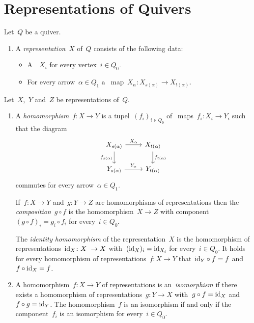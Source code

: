 \section{Representations of Quivers}


\begin{remarkdefinition}
  Let~$Q$ be a quiver.
  \begin{enumerate}
    \item
      A \emph{representation}~$X$ of~$Q$ consists of the following data:
      \begin{itemize}
        \item
          A~{\module{$\kf$}}~$X_i$ for every vertex~$i \in Q_0$.
        \item
          For every arrow~$\alpha \in Q_1$ a~{\klin} map~$X_\alpha \colon X_{s(\alpha)} \to X_{t(\alpha)}$.
      \end{itemize}
  \end{enumerate}
  Let~$X$,~$Y$ and~$Z$ be representations of~$Q$.
  \begin{enumerate}[resume]
    \item
      A \emph{homomorphism}~$f \colon X \to Y$ is a tupel~$(f_i)_{i \in Q_0}$ of~{\klin} maps~$f_i \colon X_i \to Y_i$ such that the diagram
      \[
        \begin{tikzcd}
            X_{s(\alpha)}
            \arrow{r}[above]{X_\alpha}
            \arrow{d}[left]{f_{s(\alpha)}}
          & X_{t(\alpha)}
            \arrow{d}[right]{f_{t(\alpha)}}
          \\
            Y_{s(\alpha)}
            \arrow{r}[above]{Y_\alpha}
          & Y_{t(\alpha)}
        \end{tikzcd}
      \]
      commutes for every arrow~$\alpha \in Q_1$.
      
      If~$f \colon X \to Y$ and~$g \colon Y \to Z$ are homomorphisms of representations then the \emph{composition}~$g \circ f$ is the homomorphism~$X \to Z$ with component~$(g \circ f)_i = g_i \circ f_i$ for every~$i \in Q_0$.
      
      The \emph{identity homomorphism} of the representation~$X$ is the homomorphism of representations~$\id_X \colon X \to X$ with~$(\operatorname{id}_X)_i = \operatorname{id}_{X_i}$ for every~$i \in Q_0$.
      It holds for every homomorphism of representations~$f \colon X \to Y$ that~${\operatorname{id}_Y} \circ f = f$ and~$f \circ {\operatorname{id}_X} = f$.
    \item
      A homomorphism~$f \colon X \to Y$ of representations is an~\emph{isomorphism} if there exists a homomorphism of representations~$g \colon Y \to X$ with~$g \circ f = \operatorname{id}_X$ and~$f \circ g = \operatorname{id}_Y$.
      The homomorphism~$f$ is an isomorphism if and only if the component~$f_i$ is an isomorphism for every~$i \in Q_0$.
  \end{enumerate}
\end{remarkdefinition}


